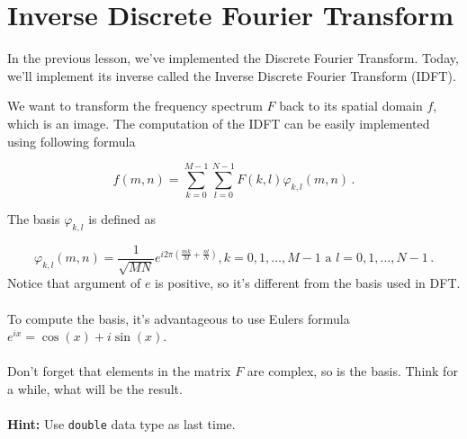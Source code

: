 \documentclass[12pt]{article}
\begin{document}
\section*{Inverse Discrete Fourier Transform}

In the previous lesson, we've implemented the Discrete Fourier Transform. Today, we'll implement its inverse called the Inverse Discrete Fourier Transform (IDFT).

We want to transform the frequency spectrum $F$ back to its spatial domain $f$, which is an image.
The computation of the IDFT can be easily implemented using following formula

\begin{equation}
    f(m, n) = \sum\limits_{k=0}^{M-1} \sum\limits_{l=0}^{N-1} F(k, l) \varphi_{k, l}(m, n)\,.
\end{equation}

The basis $\varphi_{k, l}$ is defined as

\begin{equation}
    \varphi_{k, l}(m, n) = \frac{1}{\sqrt{MN}} e^{i 2 \pi \left( \frac{mk}{M} + \frac{nl}{N} \right) }, k = 0, 1, \dots, M-1 \,\, \mathrm{a} \,\, l = 0, 1, \dots, N-1\,.
\end{equation}
Notice that argument of $e$ is positive, so it's different from the basis used in DFT.
\\
\\
To compute the basis, it's advantageous to use Eulers formula $e^{ix} = \cos( x ) + i \sin( x )$.
\\
\\
Don't forget that elements in the matrix $F$ are complex, so is the basis. Think for a while, what will be the result.
\\
\\
\textbf{Hint:} Use \texttt{double} data type as last time.
\end{document}
